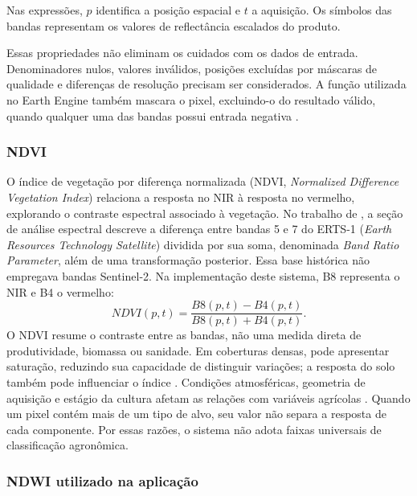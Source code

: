Nas expressões, $p$ identifica a posição espacial e $t$ a aquisição. Os símbolos das bandas representam os valores de reflectância escalados do produto.

Essas propriedades não eliminam os cuidados com os dados de entrada. Denominadores nulos, valores inválidos, posições excluídas por máscaras de qualidade e diferenças de resolução precisam ser considerados. A função utilizada no Earth Engine também mascara o pixel, excluindo-o do resultado válido, quando qualquer uma das bandas possui entrada negativa \citep{GOOGLE_EE_ND}.

\subsubsection{NDVI}

O índice de vegetação por diferença normalizada (NDVI, \textit{Normalized Difference Vegetation Index}) relaciona a resposta no NIR à resposta no vermelho, explorando o contraste espectral associado à vegetação. No trabalho de \citet{ROUSE1974_NTRS}, a seção de análise espectral descreve a diferença entre bandas 5 e 7 do ERTS-1 (\textit{Earth Resources Technology Satellite}) dividida por sua soma, denominada \textit{Band Ratio Parameter}, além de uma transformação posterior. Essa base histórica não empregava bandas Sentinel-2. Na implementação deste sistema, B8 representa o NIR e B4 o vermelho:
\begin{equation}\label{eq:ndvi-final}
 NDVI(p,t)=\frac{B8(p,t)-B4(p,t)}{B8(p,t)+B4(p,t)}.
\end{equation}
O NDVI resume o contraste entre as bandas, não uma medida direta de produtividade, biomassa ou sanidade. Em coberturas densas, pode apresentar saturação, reduzindo sua capacidade de distinguir variações; a resposta do solo também pode influenciar o índice \citep{GAO1996}. Condições atmosféricas, geometria de aquisição e estágio da cultura afetam as relações com variáveis agrícolas \citep{WEISS2020}. Quando um pixel contém mais de um tipo de alvo, seu valor não separa a resposta de cada componente. Por essas razões, o sistema não adota faixas universais de classificação agronômica.

\subsubsection{NDWI utilizado na aplicação}

